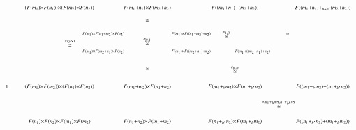 \documentclass[reqno]{amsart}
\begin{document}
\[
\begin{tikzpicture}[scale=1.6]
\node () at (4.8,0.75) {$\scriptstyle\stackrel{1 \times \mu \times 1}{\cong}$};
\node () at (7,1.4) {$\scriptstyle{\cong}$};
\node () at (7,0.8) {$\scriptstyle\stackrel{\phi_{\beta,1}}{\cong}$};
\node () at (7,0) {$\scriptstyle{\cong}$};
\node () at (9.5,0) {$\scriptstyle\stackrel{\phi_{\psi,\psi}}{\cong}$};
\node () at (9.25,1) {$\scriptstyle\stackrel{\phi_{1,\beta}}{\cong}$};
\node () at (11,1) {$\scriptstyle{\cong}$};
\node () at (10.75,-1) {$\scriptstyle\stackrel{\mu_{m_1+_b m_2,n_1+_{b'}n_2}}\cong$};
\node (D) at (3,-0.5) {$\scriptstyle{\one}$};
\node (E) at (7,-0.5) {$\scriptstyle{F(m_1+m_2) \times F(n_1+n_2)}$};
\node (E') at (9.5,-0.5) {$\scriptstyle{F(m_1+_b m_2) \times F(n_1+_{b'}n_2)}$};
\node (E'') at (12,-0.5) {$\scriptstyle{F((m_1+_b m_2)+(n_1+_{b'}n_2))}$};
\node (C) at (7,1.75) {$\scriptstyle{F(m_1+n_1) \times F(m_2+n_2)}$};
\node (A) at (9.5,1.75) {$\scriptstyle{F((m_1+n_1)+(m_2+n_2))}$};
\node (A') at (12,1.75) {$\scriptstyle{F((m_1+n_1)+_{b+b'} (m_2+n_2))}$};
\node (G) at (4.5,1.75) {$\scriptstyle{(F(m_1) \times F(n_1)) \times (F(m_2) \times F(n_2))}$};
\node (G') at (4.5,-0.5) {$\scriptstyle{(F(m_1) \times F(m_2)) \times (F(n_1) \times F(n_2))}$};
\node (G'') at (4.5,-1.5) {$\scriptstyle{F(n_1) \times F(n_2) \times F(m_1) \times F(m_2)}$};
\node (F) at (7,-1.5) {$\scriptstyle{F(n_1+n_2) \times F(m_1+m_2)}$};
\node (F') at (9.5,-1.5) {$\scriptstyle{F(n_1+_{b'}n_2) \times F(m_1+_b m_2)}$};
\node (B) at (5.75,1) {$\scriptscriptstyle{F(m_1) \times F(n_1+m_2) \times F(n_2)}$};
\node (B') at (8.25,1) {$\scriptscriptstyle{F(m_1) \times F((n_1+m_2)+n_2)}$};
\node (B'') at (5.75,0.5) {$\scriptscriptstyle{F(m_1) \times F(m_2+n_1) \times F(n_2)}$};
\node (B''') at (8.25,0.5) {$\scriptscriptstyle{F(m_1) \times F((m_2+n_1)+n_2)}$};
\node (H) at (10,0.5) {$\scriptscriptstyle{F(m_1+((m_2+n_1)+n_2)}$};
\node (C'') at (12,-1.5) {$\scriptstyle{F((n_1+_{b'}n_2)+(m_1+_b m_2))}$};

\end{tikzpicture}\]
\end{document}
